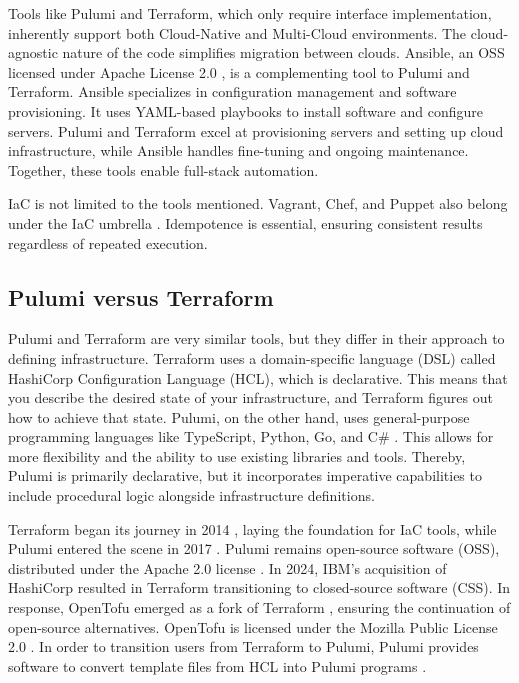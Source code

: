 Tools like Pulumi and Terraform, which only require interface implementation, inherently support both Cloud-Native and Multi-Cloud environments. The cloud-agnostic nature of the code simplifies migration between clouds. Ansible, an OSS licensed under Apache License 2.0 \Parencite{ansible_license}, is a complementing tool to Pulumi and Terraform. Ansible specializes in configuration management and software provisioning. It uses YAML-based playbooks to install software and configure servers. Pulumi and Terraform excel at provisioning servers and setting up cloud infrastructure, while Ansible handles fine-tuning and ongoing maintenance. Together, these tools enable full-stack automation.

IaC is not limited to the tools mentioned. Vagrant, Chef, and Puppet also belong under the IaC umbrella \Parencite{spacelift_iac_tools}. Idempotence is essential, ensuring consistent results regardless of repeated execution.

\subsection{Pulumi versus Terraform}
Pulumi and Terraform are very similar tools, but they differ in their approach to defining infrastructure. Terraform uses a domain-specific language (DSL) called HashiCorp Configuration Language (HCL), which is declarative. This means that you describe the desired state of your infrastructure, and Terraform figures out how to achieve that state. Pulumi, on the other hand, uses general-purpose programming languages like TypeScript, Python, Go, and C\# \Parencite{pulumi_vs_terraform}. This allows for more flexibility and the ability to use existing libraries and tools. Thereby, Pulumi is primarily declarative, but it incorporates imperative capabilities to include procedural logic alongside infrastructure definitions.

Terraform began its journey in 2014 \Parencite{hashicorpTerraform}, laying the foundation for IaC tools, while Pulumi entered the scene in 2017 \Parencite{pulumiAbout}. Pulumi remains open-source software (OSS), distributed under the Apache 2.0 license \Parencite{pulumiLicense2025}. In 2024, IBM's acquisition of HashiCorp resulted in Terraform transitioning to closed-source software (CSS). In response, OpenTofu emerged as a fork of Terraform \Parencite{opentofu}, ensuring the continuation of open-source alternatives. OpenTofu is licensed under the Mozilla Public License 2.0 \Parencite{opentofuLicense2025}. In order to transition users from Terraform to Pulumi, Pulumi provides software to convert template files from HCL into Pulumi programs \Parencite{pulumiMigration2025}.

